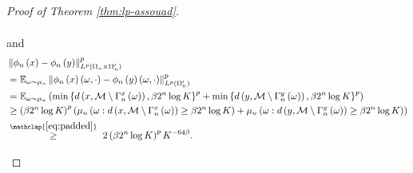 \documentclass[11pt,reqno]{amsart}
\newcommand{\1}{\mathbf 1}
\begin{document}
\begin{proof}[Proof of Theorem \ref{thm:lp-assouad}]
\begin{enumerate}
\begin{align*}
\end{align*}
and
\begin{align}\label{eq:assouad-lowerbound}
\begin{aligned}
    &\left\|\phi_n\left(x\right)-\phi_n\left(y\right)\right\|_{L^p\left(\Omega_n\times \Omega_n'\right)}^p\\
    &=\mathbb{E}_{\omega\sim\mu_n}\left\|\phi_n\left(x\right)\left(\omega,\cdot\right)-\phi_n\left(y\right)\left(\omega,\cdot\right)\right\|^p_{L^p\left(\Omega_n'\right)}\\
    &=\mathbb{E}_{\omega\sim\mu_n}\left(\min\left\{d\left(x,\mathcal{M}\setminus \Gamma^x_n\left(\omega\right)\right),\beta 2^n\log K\right\}^p+\min\left\{d\left(y,\mathcal{M}\setminus \Gamma^y_n\left(\omega\right)\right),\beta 2^n\log K\right\}^p\right)\\
    &\ge \left(\beta 2^n\log K\right)^p\left(\mu_n\left(\omega:d\left(x,\mathcal{M}\setminus \Gamma^x_n\left(\omega\right)\right)\ge \beta 2^n\log K\right)+\mu_n\left(\omega:d\left(y,\mathcal{M}\setminus \Gamma^y_n\left(\omega\right)\right)\ge\beta 2^n\log K\right)\right)\\
    &\stackrel{\mathclap{\eqref{eq:padded}}}{\ge}~  2\left(\beta 2^n\log K\right)^p K^{-64\beta}.
\end{aligned}
\end{align}


\end{enumerate}
\end{proof}
\end{document}
